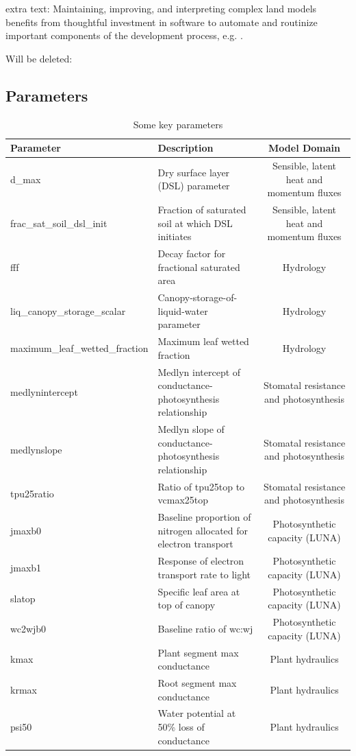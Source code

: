 \documentclass[draft]{agujournal2019}
\begin{document}
extra text:
Maintaining, improving, and interpreting complex land models benefits from thoughtful investment in software to automate and routinize important components of the development process, e.g. . 

Will be deleted:
\subsection{Parameters} 
\begin{landscape}
 \begin{table}[h]
 \caption{Some key parameters}
 \centering
 \begin{tabular}{l l c}
 \hline
  Parameter  & Description & Model Domain \\
 \hline
d\_max & Dry surface layer (DSL) parameter & Sensible, latent heat and momentum fluxes \\
frac\_sat\_soil\_dsl\_init & Fraction of saturated soil at which DSL initiates & Sensible, latent heat and momentum fluxes \\
fff & Decay factor for fractional saturated area & Hydrology \\
liq\_canopy\_storage\_scalar & Canopy-storage-of-liquid-water parameter & Hydrology \\
maximum\_leaf\_wetted\_fraction & Maximum leaf wetted fraction & Hydrology \\
medlynintercept & Medlyn intercept of conductance-photosynthesis relationship & Stomatal resistance and photosynthesis \\
medlynslope & Medlyn slope of conductance-photosynthesis relationship & Stomatal resistance and photosynthesis \\
tpu25ratio & Ratio of tpu25top to vcmax25top & Stomatal resistance and photosynthesis \\
jmaxb0 & Baseline proportion of nitrogen allocated for electron transport & Photosynthetic capacity (LUNA) \\
jmaxb1 & Response of electron transport rate to light & Photosynthetic capacity (LUNA) \\
slatop & Specific leaf area at top of canopy & Photosynthetic capacity (LUNA) \\
wc2wjb0 & Baseline ratio of wc:wj & Photosynthetic capacity (LUNA) \\
kmax & Plant segment max conductance & Plant hydraulics \\
krmax & Root segment max conductance & Plant hydraulics \\
psi50 & Water potential at 50\% loss of conductance & Plant hydraulics \\

\end{tabular}
\end{table}
\end{landscape}
\end{document}
